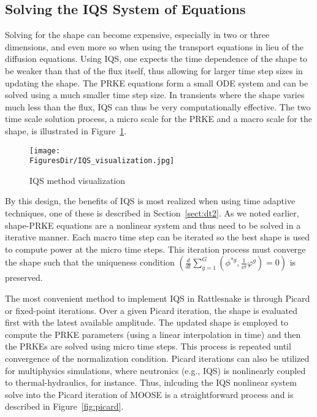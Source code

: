 \documentclass[12pt]{scrartcl}
\newcommand{\rattlesnake}{Rattlesnake }
\newcommand{\fig}[1]{Figure~\ref{#1}}                      %
\newcommand{\sct}[1]{Section~\ref{#1}}                   %
\newcommand{\FiguresDir}{./figs}
\begin{document}
\subsection{Solving the IQS System of Equations}

Solving for the shape can become expensive, especially in two or three dimensions, and even more so when using the transport equations in lieu of the diffusion equations.  Using IQS, one expects the time dependence of the shape to be weaker than that of the flux itself,  thus allowing for larger time step sizes in updating the shape. The PRKE equations form a small ODE system and can be solved using a much smaller time step size. In transients where the shape varies much less than the flux, IQS can thus be very computationally effective. The two time scale solution process, a micro scale for the PRKE and a macro scale for the shape, is illustrated in \fig{fig:iqsviz}.

\begin{figure}[!htbp]
\texttt{[image: \\FiguresDir/IQS\_visualization.jpg]}
\caption{IQS method visualization}
\label{fig:iqsviz}
\end{figure}

By this design, the benefits of IQS is most realized when using time adaptive techniques, one of these is described in  \sct{sect:dt2}.  As we noted earlier, shape-PRKE equations are a nonlinear system and thus need to be solved in a iterative manner.  Each macro time step can be iterated so the best shape is used to compute power at the micro time steps.  This iteration process must converge the shape such that the uniqueness condition $(\frac{d}{dt}\sum_{g=1}^G\left(\phi^{*g},\frac{1}{v^g}\varphi^g\right)=0)$ is preserved.  

The most convenient method to implement IQS in \rattlesnake is through Picard or fixed-point iterations. Over a given Picard iteration, the shape is evaluated first with the latest available amplitude. The updated shape is employed to compute the PRKE parameters (using a linear interpolation in time) and then the PRKEs are solved using micro time steps. This process is repeated until convergence of the normalization condition. Picard iterations can also be utilized for multiphysics simulations, where neutronics (e.g., IQS) is nonlinearly coupled to thermal-hydraulics, for instance.  Thus, inlcuding the IQS nonlinear system solve into the Picard iteration of MOOSE is a straightforward process and is described in \fig{fig:picard}.
\end{document}

